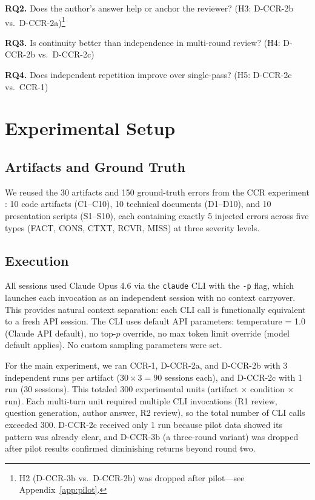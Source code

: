 \documentclass[11pt]{article}
\begin{document}
\textbf{RQ2.} Does the author's answer help or anchor the reviewer? (H3: D-CCR-2b vs.\ D-CCR-2a)\footnote{H2 (D-CCR-3b vs.\ D-CCR-2b) was dropped after pilot---see Appendix~\ref{app:pilot}.}

\textbf{RQ3.} Is continuity better than independence in multi-round review? (H4: D-CCR-2b vs.\ D-CCR-2c)

\textbf{RQ4.} Does independent repetition improve over single-pass? (H5: D-CCR-2c vs.\ CCR-1)

\section{Experimental Setup}

\subsection{Artifacts and Ground Truth}

We reused the 30 artifacts and 150 ground-truth errors from the CCR experiment \citep{song2026ccr}: 10 code artifacts (C1--C10), 10 technical documents (D1--D10), and 10 presentation scripts (S1--S10), each containing exactly 5 injected errors across five types (FACT, CONS, CTXT, RCVR, MISS) at three severity levels.

\subsection{Execution}

All sessions used Claude Opus 4.6 via the \texttt{claude} CLI with the \texttt{-p} flag, which launches each invocation as an independent session with no context carryover.
This provides natural context separation: each CLI call is functionally equivalent to a fresh API session.
The CLI uses default API parameters: temperature = 1.0 (Claude API default), no top-$p$ override, no max token limit override (model default applies).
No custom sampling parameters were set.

For the main experiment, we ran CCR-1, D-CCR-2a, and D-CCR-2b with 3 independent runs per artifact ($30 \times 3 = 90$ sessions each), and D-CCR-2c with 1 run (30 sessions).
This totaled 300 experimental units (artifact $\times$ condition $\times$ run).
Each multi-turn unit required multiple CLI invocations (R1 review, question generation, author answer, R2 review), so the total number of CLI calls exceeded 300.
D-CCR-2c received only 1 run because pilot data showed its pattern was already clear, and D-CCR-3b (a three-round variant) was dropped after pilot results confirmed diminishing returns beyond round two.
\end{document}
